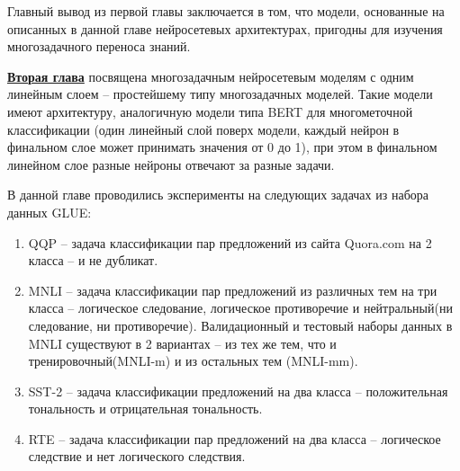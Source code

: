 Главный {вывод} из первой главы заключается в том, что модели, основанные на описанных в данной главе нейросетевых архитектурах, пригодны для изучения многозадачного переноса знаний.

\underline{\textbf{Вторая глава}} посвящена многозадачным нейросетевым моделям с одним линейным слоем -- простейшему типу многозадачных моделей. Такие модели имеют архитектуру, аналогичную модели типа BERT для многометочной классификации (один линейный слой поверх модели, каждый нейрон в финальном слое может принимать значения от 0 до 1), при этом в финальном линейном слое разные нейроны отвечают за разные задачи.

В данной главе проводились эксперименты на следующих задачах из набора данных GLUE:
\begin{enumerate}
    \item QQP -- задача классификации пар предложений из сайта Quora.com на 2 класса -- и не дубликат.
    \item MNLI -- задача классификации пар предложений из различных тем на три класса -- логическое следование, логическое противоречие и нейтральный(ни следование, ни противоречие). Валидационный и тестовый наборы данных в MNLI существуют в 2 вариантах -- из тех же тем, что и тренировочный(MNLI-m) и из остальных тем (MNLI-mm).
    \item SST-2 -- задача классификации предложений на два класса -- положительная тональность и отрицательная тональность.
    \item RTE -- задача классификации пар предложений на два класса -- логическое следствие и нет логического следствия.
\end{enumerate}

